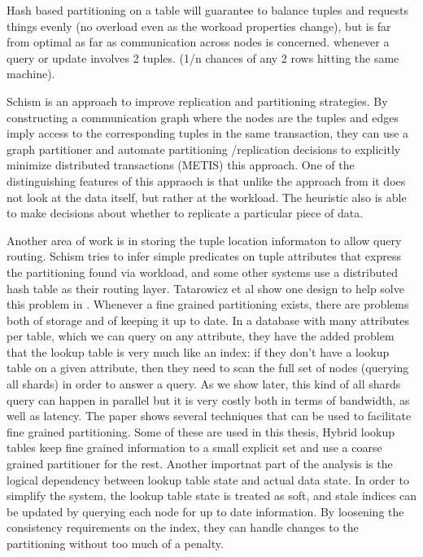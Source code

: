 Hash based partitioning on a table will guarantee to balance tuples and requests things evenly (no overload even as the workoad properties change), but is far from optimal as far as communication across nodes is concerned. whenever a query or update involves 2 tuples. (1/n chances of any 2 rows hitting the same machine). 

Schism \cite{schism} is an approach to improve replication and partitioning strategies.  By constructing a communication graph where the nodes are the tuples and edges imply access to the corresponding tuples in the same transaction, they can use a graph partitioner and automate partitioning /replication decisions to explicitly minimize distributed transactions (METIS) this approach. One of the distinguishing features of this appraoch  is that unlike the approach from \cite{little} it does not look at the data itself, but rather at the workload. The heuristic also is able to make decisions about whether to replicate a particular piece of data.

Another area of work is in storing the tuple location informaton to allow query routing. Schism tries to infer simple predicates on tuple attributes that express the partitioning found via workload, and some other systems use a distributed hash table as their routing layer. Tatarowicz et al show one design to help solve this problem in \cite{lookup}.  Whenever a fine grained partitioning exists, there are problems both of storage and of keeping it up to date. In a database with many attributes per table, which we can query on any attribute, they have the added problem that the lookup table is very much like an index: if they don't have a lookup table on a given attribute, then they need to scan the full set of nodes (querying all shards) in order to answer a query. As we show later, this kind of all shards query can happen in parallel but it is very costly both in terms of  bandwidth, as well as latency. The paper shows several techniques that can be used to facilitate fine grained partitioning. Some of these are used in this thesis, Hybrid lookup tables keep fine grained information to a small explicit set and use a coarse grained partitioner for the rest. Another importnat part of the analysis is the logical dependency between lookup table state and actual data state. In order to simplify the system, the lookup table state is treated as soft, and stale indices can be updated by querying each node for up to date information. By loosening the consistency requirements on the index, they can handle changes to the partitioning without too much of a penalty.

